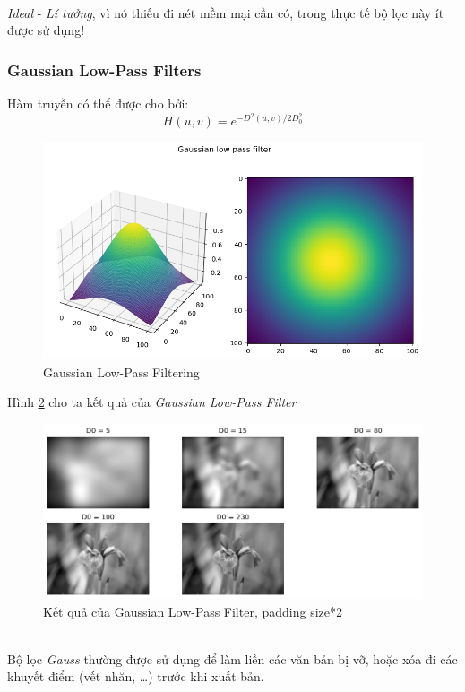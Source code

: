 \documentclass{article}
\begin{document}
        \phantom{a}\\
        \textit{Ideal} - \textit{Lí tưởng}, vì nó thiếu đi nét mềm mại cần có, trong thực tế bộ lọc này ít được sử dụng!
        \subsubsection{Gaussian Low-Pass Filters}
        Hàm truyền có thể được cho bởi:
        $$H(u,v) = e^{-D^2(u,v)/2D_{0}^{2}}$$

        \begin{figure}[ht!]
        \centering
        \includegraphics[width = \linewidth]{fo11.png}
        \caption{Gaussian Low-Pass Filtering}
        \label{fig12}
        \end{figure}
        Hình \ref{fig13} cho ta kết quả của \textit{Gaussian Low-Pass Filter}
        \begin{figure}[ht!]
        \centering
        \includegraphics[width = \linewidth]{fo12.png}
        \caption{Kết quả của Gaussian Low-Pass Filter, padding size*2}
        \label{fig13}
        \end{figure}
        \phantom{a}\\
        Bộ lọc \textit{Gauss} thường được sử dụng để làm liền các văn bản bị vỡ, hoặc xóa đi các khuyết điểm (vết nhăn, \ldots) trước khi xuất bản.
\end{document}
